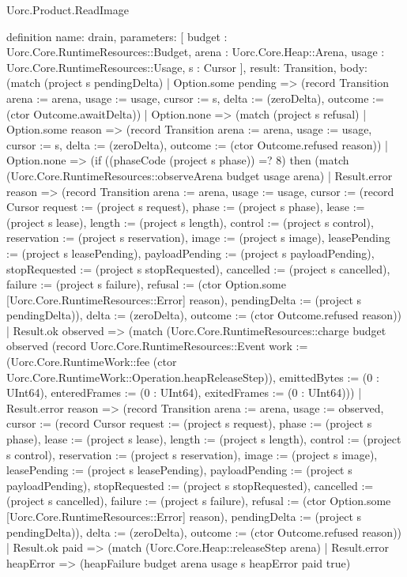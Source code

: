 \begin{lexlean}{Uorc.Product.ReadImage}
\begin{semanticmodule}
definition{
  name: drain,
  parameters: [
    budget : Uorc.Core.RuntimeResources::Budget,
    arena : Uorc.Core.Heap::Arena,
    usage : Uorc.Core.RuntimeResources::Usage,
    s : Cursor
  ],
  result: Transition,
  body: (match (project s pendingDelta)
    | Option.some pending => (record Transition {arena := arena, usage := usage, cursor := s, delta := (zeroDelta), outcome := (ctor Outcome.awaitDelta)})
    | Option.none => (match (project s refusal)
      | Option.some reason => (record Transition {arena := arena, usage := usage, cursor := s, delta := (zeroDelta), outcome := (ctor Outcome.refused reason)})
      | Option.none => (if ((phaseCode (project s phase)) =? 8) then (match (Uorc.Core.RuntimeResources::observeArena budget usage arena)
        | Result.error reason => (record Transition {arena := arena, usage := usage, cursor := (record Cursor {request := (project s request), phase := (project s phase), lease := (project s lease), length := (project s length), control := (project s control), reservation := (project s reservation), image := (project s image), leasePending := (project s leasePending), payloadPending := (project s payloadPending), stopRequested := (project s stopRequested), cancelled := (project s cancelled), failure := (project s failure), refusal := (ctor Option.some [Uorc.Core.RuntimeResources::Error] reason), pendingDelta := (project s pendingDelta)}), delta := (zeroDelta), outcome := (ctor Outcome.refused reason)})
        | Result.ok observed => (match (Uorc.Core.RuntimeResources::charge budget observed (record Uorc.Core.RuntimeResources::Event {work := (Uorc.Core.RuntimeWork::fee (ctor Uorc.Core.RuntimeWork::Operation.heapReleaseStep)), emittedBytes := (0 : UInt64), enteredFrames := (0 : UInt64), exitedFrames := (0 : UInt64)}))
          | Result.error reason => (record Transition {arena := arena, usage := observed, cursor := (record Cursor {request := (project s request), phase := (project s phase), lease := (project s lease), length := (project s length), control := (project s control), reservation := (project s reservation), image := (project s image), leasePending := (project s leasePending), payloadPending := (project s payloadPending), stopRequested := (project s stopRequested), cancelled := (project s cancelled), failure := (project s failure), refusal := (ctor Option.some [Uorc.Core.RuntimeResources::Error] reason), pendingDelta := (project s pendingDelta)}), delta := (zeroDelta), outcome := (ctor Outcome.refused reason)})
          | Result.ok paid => (match (Uorc.Core.Heap::releaseStep arena)
            | Result.error heapError => (heapFailure budget arena usage s heapError paid true)
}
\end{semanticmodule}
\end{lexlean}
